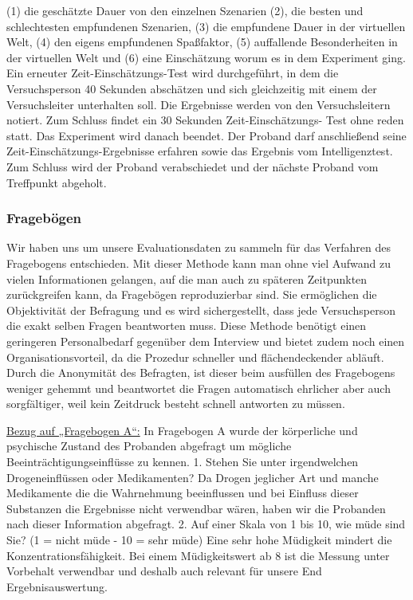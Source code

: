 \documentclass{Bericht}
\begin{document}
(1) die geschätzte Dauer von den einzelnen Szenarien (2), die besten und schlechtesten empfundenen
Szenarien, (3) die empfundene Dauer in der virtuellen Welt, (4) den eigens empfundenen Spaßfaktor, (5) auffallende Besonderheiten in der virtuellen Welt und (6) eine Einschätzung
worum es in dem Experiment ging.
Ein erneuter Zeit-Einschätzungs-Test wird durchgeführt, in dem die Versuchsperson 40 Sekunden
abschätzen und sich gleichzeitig mit einem der Versuchsleiter unterhalten soll. Die Ergebnisse
werden von den Versuchsleitern notiert. Zum Schluss findet ein 30 Sekunden Zeit-Einschätzungs-
Test ohne reden statt. Das Experiment wird danach beendet. Der Proband darf anschließend
seine Zeit-Einschätzungs-Ergebnisse erfahren sowie das Ergebnis vom Intelligenztest.
Zum Schluss wird der Proband verabschiedet und der nächste Proband vom Treffpunkt
abgeholt.
\subsubsection{Fragebögen}
Wir haben uns um unsere Evaluationsdaten zu sammeln für das Verfahren des Fragebogens
entschieden. Mit dieser Methode kann man ohne viel Aufwand zu vielen Informationen gelangen,
auf die man auch zu späteren Zeitpunkten zurückgreifen kann, da Fragebögen reproduzierbar
sind. Sie ermöglichen die Objektivität der Befragung und es wird sichergestellt, dass
jede Versuchsperson die exakt selben Fragen beantworten muss. Diese Methode benötigt einen
geringeren Personalbedarf gegenüber dem Interview und bietet zudem noch einen Organisationsvorteil,
da die Prozedur schneller und flächendeckender abläuft. Durch die Anonymität des
Befragten, ist dieser beim ausfüllen des Fragebogens weniger gehemmt und beantwortet die
Fragen automatisch ehrlicher aber auch sorgfältiger, weil kein Zeitdruck besteht schnell antworten
zu müssen.
\par
\underline{Bezug auf „Fragebogen A“:}
In Fragebogen A wurde der körperliche und psychische Zustand des Probanden abgefragt um
mögliche Beeinträchtigungseinflüsse zu kennen.
1. Stehen Sie unter irgendwelchen Drogeneinflüssen oder Medikamenten?
Da Drogen jeglicher Art und manche Medikamente die die Wahrnehmung beeinflussen und bei
Einfluss dieser Substanzen die Ergebnisse nicht verwendbar wären, haben wir die Probanden
nach dieser Information abgefragt.
2. Auf einer Skala von 1 bis 10, wie müde sind Sie? (1 = nicht müde - 10 = sehr müde)
Eine sehr hohe Müdigkeit mindert die Konzentrationsfähigkeit. Bei einem Müdigkeitswert ab 8
ist die Messung unter Vorbehalt verwendbar und deshalb auch relevant für unsere End Ergebnisauswertung.
\end{document}
